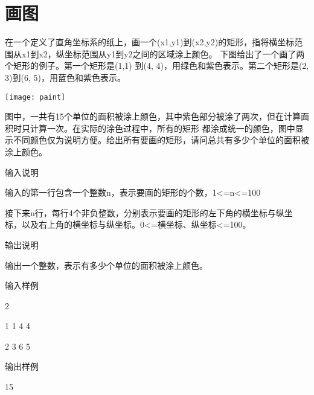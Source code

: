\section{画图}
在一个定义了直角坐标系的纸上，画一个(x1,y1)到(x2,y2)的矩形，指将横坐标范围从x1到x2，纵坐标范围从y1到y2之间的区域涂上颜色。    
下图给出了一个画了两个矩形的例子。第一个矩形是(1,1) 到(4, 4)，用绿色和紫色表示。第二个矩形是(2, 3)到(6, 5)，用蓝色和紫色表示。

\begin{center}
	\texttt{[image: paint]}
\end{center}

图中，一共有15个单位的面积被涂上颜色，其中紫色部分被涂了两次，但在计算面积时只计算一次。在实际的涂色过程中，所有的矩形 都涂成统一的颜色，图中显示不同颜色仅为说明方便。给出所有要画的矩形，请问总共有多少个单位的面积被涂上颜色。

输入说明 

输入的第一行包含一个整数n，表示要画的矩形的个数，1<=n<=100   

接下来n行，每行4个非负整数，分别表示要画的矩形的左下角的横坐标与纵坐标，以及右上角的横坐标与纵坐标。0<=横坐标、纵坐标<=100。

输出说明	

输出一个整数，表示有多少个单位的面积被涂上颜色。

输入样例

2 

1 1 4 4 

2 3 6 5 

输出样例

15

